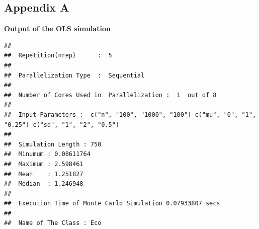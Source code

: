 \documentclass[11pt,a4paper]{article}
\begin{document}
\hypertarget{appendix-a}{%
\subsection{Appendix A}\label{appendix-a}}

\textbf{Output of the OLS simulation}

\begin{verbatim}
## 
##  Repetition(nrep)      :  5 
## 
##  Parallelization Type  :  Sequential 
## 
##  Number of Cores Used in  Parallelization :  1  out of 8 
## 
##  Input Parameters :  c("n", "100", "1000", "100") c("mu", "0", "1", "0.25") c("sd", "1", "2", "0.5") 
## 
##  Simulation Length : 750 
##  Minumum : 0.08611764 
##  Maximum : 2.598461 
##  Mean    : 1.251827 
##  Median  : 1.246948 
## 
##  Execution Time of Monte Carlo Simulation 0.07933807 secs 
## 
##  Name of The Class : Eco
\end{verbatim}
\end{document}

